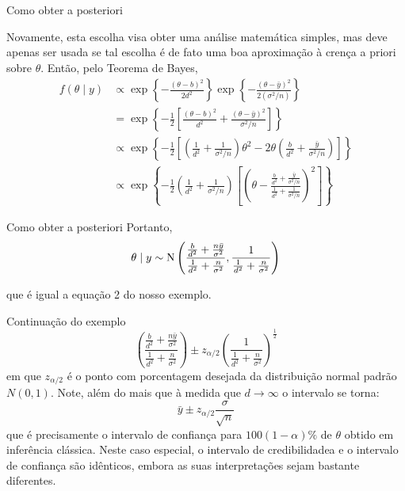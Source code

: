 \documentclass{beamer}
\theoremstyle{definition}
\begin{document}
\begin{frame}{Como obter a posteriori}
    
Novamente, esta escolha visa obter uma análise matemática simples, mas deve apenas ser usada se tal escolha é de fato uma boa aproximação à crença a priori sobre $\theta$. Então, pelo Teorema de Bayes,
$$
\begin{aligned}
f(\theta \mid y) & \propto \exp \left\{-\frac{(\theta-b)^2}{2 d^2}\right\} \exp \left\{-\frac{(\theta-\bar{y})^2}{2\left(\sigma^2 / n\right)}\right\} \\
& =\exp \left\{-\frac{1}{2}\left[\frac{(\theta-b)^2}{d^2}+\frac{(\theta-\bar{y})^2}{\sigma^2 / n}\right]\right\} \\
& \propto \exp \left\{-\frac{1}{2}\left[\left(\frac{1}{d^2}+\frac{1}{\sigma^2 / n}\right) \theta^2-2 \theta\left(\frac{b}{d^2}+\frac{\bar{y}}{\sigma^2 / n}\right)\right]\right\} \\
& \propto \exp \left\{-\frac{1}{2}\left(\frac{1}{d^2}+\frac{1}{\sigma^2 / n}\right)\left[\left(\theta-\frac{\frac{b}{d^2}+\frac{\bar{y}}{\sigma^2 / n}}{\frac{1}{d^2}+\frac{1}{\sigma^2 / n}}\right)^2\right]\right\}
\end{aligned}
$$
\end{frame}

\begin{frame}{Como obter a posteriori}
    Portanto,
    \begin{equation}
        \theta \mid y \sim \mathrm{N}\left(\frac{\frac{b}{d^2}+\frac{n \bar{y}}{\sigma^2}}{\frac{1}{d^2}+\frac{n}{\sigma^2}}, \frac{1}{\frac{1}{d^2}+\frac{n}{\sigma^2}}\right)
          \vspace{0.8cm}
    \end{equation}
  
    que é igual a equação 2 do nosso exemplo.
\end{frame}

\begin{frame}{Continuação do exemplo}
$$
\left(\frac{\frac{b}{d^2}+\frac{n \bar{y}}{\sigma^2}}{\frac{1}{d^2}+\frac{n}{\sigma^2}}\right) \pm z_{\alpha / 2}\left(\frac{1}{\frac{1}{d^2}+\frac{n}{\sigma^2}}\right)^{\frac{1}{2}}
$$
em que $z_{\alpha / 2}$ é o ponto com porcentagem desejada da distribuição normal padrão $N(0,1)$. Note, além do mais que à medida que $d \rightarrow \infty$ o intervalo se torna:
$$
\bar{y} \pm z_{\alpha / 2} \frac{\sigma}{\sqrt{n}}
$$
que é precisamente o intervalo de confiança para $100(1-\alpha) \%$ de $\theta$ obtido em inferência clássica. Neste caso especial, o intervalo de credibilidadea e o intervalo de confiança são idênticos, embora as suas interpretações sejam bastante diferentes.
\end{frame}
\end{document}
